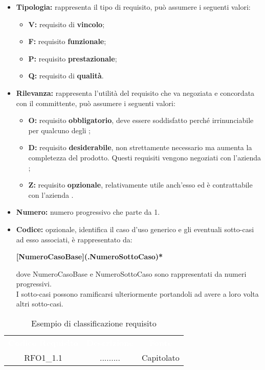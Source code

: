 \begin{itemize}
	\item \textbf{Tipologia:} rappresenta il tipo di requisito, può assumere i seguenti valori:
	\begin{itemize}
		\item \textbf{V:} requisito di \textbf{vincolo};
		\item \textbf{F:} requisito \textbf{funzionale};
		\item \textbf{P:} requisito \textbf{prestazionale};
		\item \textbf{Q:} requisito di \textbf{qualità}.
	\end{itemize}
	\item \textbf{Rilevanza:} rappresenta l'utilità del requisito che va negoziata e concordata con il committente, può assumere i seguenti valori:
	\begin{itemize}
		\item \textbf{O:} requisito \textbf{obbligatorio}, deve essere soddisfatto perché irrinunciabile per qualcuno degli ;
		\item \textbf{D:} requisito \textbf{desiderabile}, non strettamente necessario ma aumenta la completezza del prodotto. Questi requisiti vengono negoziati con l'azienda \Proponente;
		\item \textbf{Z:} requisito \textbf{opzionale}, relativamente utile anch'esso ed è contrattabile con l'azienda \Proponente.
	\end{itemize}
	\item \textbf{Numero:} numero progressivo che parte da 1.
	\item \textbf{Codice:} opzionale, identifica il caso d'uso generico e gli eventuali sotto-casi ad esso associati, è rappresentato da:
	\begin{center}
		\textbf{[NumeroCasoBase](.NumeroSottoCaso)*}
	\end{center}
	dove NumeroCasoBase e NumeroSottoCaso sono rappresentati da numeri progressivi.\\
	I sotto-casi possono ramificarsi ulteriormente portandoli ad avere a loro volta altri sotto-casi.
\end{itemize}

\begin{table}[h]
	\centering
	\caption{Esempio di classificazione requisito} 
	
\renewcommand{\arraystretch}{1.5}
\begin{tabular}{|c c c|} 
	
	\rowcolor{darkblue}
	\textcolor{white}{\textbf{Codice Requisito}}&
	\textcolor{white}{\textbf{Descrizione}}&
	\textcolor{white}{\textbf{Fonte}}\\	

	RFO1\_1.1 & ......... & Capitolato\\
	\hline
\end{tabular}
\end{table}

